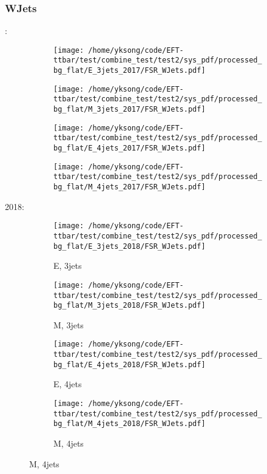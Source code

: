 \documentclass{beamer}
\begin{document}
\begin{frame}
\frametitle{WJets}
\fontsize{5}{1}:
\begin{figure}
\centering
\begin{subfigure}[b]{0.24\textwidth}
\texttt{[image: /home/yksong/code/EFT-ttbar/test/combine\_test/test2/sys\_pdf/processed\_bg\_flat/E\_3jets\_2017/FSR\_WJets.pdf]}
\end{subfigure}
\begin{subfigure}[b]{0.24\textwidth}
\texttt{[image: /home/yksong/code/EFT-ttbar/test/combine\_test/test2/sys\_pdf/processed\_bg\_flat/M\_3jets\_2017/FSR\_WJets.pdf]}
\end{subfigure}
\begin{subfigure}[b]{0.24\textwidth}
\texttt{[image: /home/yksong/code/EFT-ttbar/test/combine\_test/test2/sys\_pdf/processed\_bg\_flat/E\_4jets\_2017/FSR\_WJets.pdf]}
\end{subfigure}
\begin{subfigure}[b]{0.24\textwidth}
\texttt{[image: /home/yksong/code/EFT-ttbar/test/combine\_test/test2/sys\_pdf/processed\_bg\_flat/M\_4jets\_2017/FSR\_WJets.pdf]}
\end{subfigure}
\end{figure}
2018:
\begin{figure}
\centering
\begin{subfigure}[b]{0.24\textwidth}
\texttt{[image: /home/yksong/code/EFT-ttbar/test/combine\_test/test2/sys\_pdf/processed\_bg\_flat/E\_3jets\_2018/FSR\_WJets.pdf]}
\captionsetup{font=tiny}
\caption{E, 3jets}
\end{subfigure}
\begin{subfigure}[b]{0.24\textwidth}
\texttt{[image: /home/yksong/code/EFT-ttbar/test/combine\_test/test2/sys\_pdf/processed\_bg\_flat/M\_3jets\_2018/FSR\_WJets.pdf]}
\captionsetup{font=tiny}
\caption{M, 3jets}
\end{subfigure}
\begin{subfigure}[b]{0.24\textwidth}
\texttt{[image: /home/yksong/code/EFT-ttbar/test/combine\_test/test2/sys\_pdf/processed\_bg\_flat/E\_4jets\_2018/FSR\_WJets.pdf]}
\captionsetup{font=tiny}
\caption{E, 4jets}
\end{subfigure}
\begin{subfigure}[b]{0.24\textwidth}
\texttt{[image: /home/yksong/code/EFT-ttbar/test/combine\_test/test2/sys\_pdf/processed\_bg\_flat/M\_4jets\_2018/FSR\_WJets.pdf]}
\captionsetup{font=tiny}
\caption{M, 4jets}
\end{subfigure}
\end{figure}
\end{frame}
\end{document}
